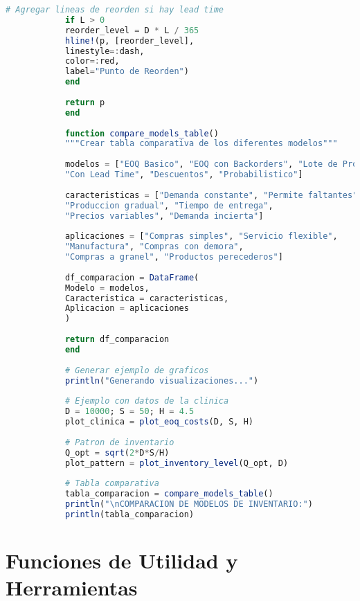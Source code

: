 \documentclass[12pt,a4paper]{book}
\begin{document}
\begin{tcolorbox}[enhanced,colback=naranjaclaro,colframe=naranjaacento,boxrule=2pt,arc=8pt,
		title={\bfseries\color{white} \faChartArea\ GR\'AFICOS Y VISUALIZACI\'ON},breakable]
\begin{lstlisting}[language=Julia,basicstyle=\footnotesize\ttfamily]
			# Agregar lineas de reorden si hay lead time
			if L > 0
			reorder_level = D * L / 365
			hline!(p, [reorder_level], 
			linestyle=:dash, 
			color=:red,
			label="Punto de Reorden")
			end
			
			return p
			end
			
			function compare_models_table()
			"""Crear tabla comparativa de los diferentes modelos"""
			
			modelos = ["EOQ Basico", "EOQ con Backorders", "Lote de Produccion", 
			"Con Lead Time", "Descuentos", "Probabilistico"]
			
			caracteristicas = ["Demanda constante", "Permite faltantes", 
			"Produccion gradual", "Tiempo de entrega",
			"Precios variables", "Demanda incierta"]
			
			aplicaciones = ["Compras simples", "Servicio flexible",
			"Manufactura", "Compras con demora",
			"Compras a granel", "Productos perecederos"]
			
			df_comparacion = DataFrame(
			Modelo = modelos,
			Caracteristica = caracteristicas,
			Aplicacion = aplicaciones
			)
			
			return df_comparacion
			end
			
			# Generar ejemplo de graficos
			println("Generando visualizaciones...")
			
			# Ejemplo con datos de la clinica
			D = 10000; S = 50; H = 4.5
			plot_clinica = plot_eoq_costs(D, S, H)
			
			# Patron de inventario
			Q_opt = sqrt(2*D*S/H)
			plot_pattern = plot_inventory_level(Q_opt, D)
			
			# Tabla comparativa
			tabla_comparacion = compare_models_table()
			println("\nCOMPARACION DE MODELOS DE INVENTARIO:")
			println(tabla_comparacion)
		\end{lstlisting}
		
	\end{tcolorbox}
	
	\section{Funciones de Utilidad y Herramientas}
	
\end{document}
